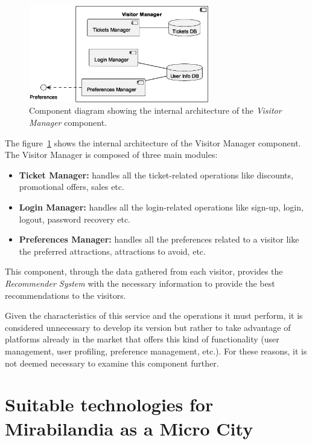 \begin{figure}[H]
	\centering
	\includegraphics[width=0.7\textwidth]{img/visitor-manager.eps}
	\caption{Component diagram showing the internal architecture of the \textit{Visitor Manager} component.
	}
	\label{fig:visitor-manager-arch}
\end{figure}

The figure~\ref{fig:visitor-manager-arch} shows the internal architecture of the Visitor Manager component. The Visitor Manager is composed of three
main modules:

\begin{itemize}
	\item \textbf{Ticket Manager:} handles all the ticket-related operations like discounts, promotional offers, sales etc.
	\item \textbf{Login Manager:} handles all the login-related operations like sign-up, login, logout, password recovery etc.
	\item \textbf{Preferences Manager:} handles all the preferences related to a visitor like the preferred attractions, attractions to avoid, etc.
\end{itemize}

This component, through the data gathered from each visitor, provides the \textit{Recommender System} with the necessary information to provide the
best recommendations to the visitors.

Given the characteristics of this service and the operations it must perform, it is considered unnecessary to develop its version but rather to take
advantage of platforms already in the market that offers this kind of functionality (user management, user profiling, preference management, etc.).
For these reasons, it is not deemed necessary to examine this component further.

\section{Suitable technologies for Mirabilandia as a Micro City}

